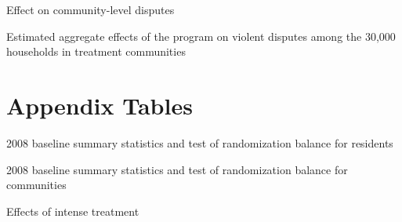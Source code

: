 \documentclass[10pt]{article}
\begin{document}
\begin{table}[H]
\caption{Effect on community-level disputes}
\begin{center}
\begin{adjustbox}{max width = \textwidth}

\end{adjustbox}
\end{center}
\end{table}

\begin{table}[H]
\caption{Estimated aggregate effects of the program on violent disputes among the 30,000 households in treatment communities}
\begin{center}
\begin{adjustbox}{max width = \textwidth}

\end{adjustbox}
\end{center}
\end{table}

\section{Appendix Tables}
\clearpage
\setcounter{table}{0}   
\renewcommand{\thetable}{A.\arabic{table}}

\begin{table}[H]
\caption{2008 baseline summary statistics and test of randomization balance for residents}
\begin{center}
\begin{adjustbox}{max width = \textwidth}

\end{adjustbox}
\end{center}
\end{table}

\begin{table}[H]
\caption{2008 baseline summary statistics and test of randomization balance for communities}
\begin{center}
\begin{adjustbox}{max width = \textwidth}

\end{adjustbox}
\end{center}
\end{table}


\begin{table}[H]
\caption{Effects of intense treatment}
\begin{center}
\begin{adjustbox}{max width = \textwidth}

\end{adjustbox}
\end{center}
\end{table}
\end{document}
